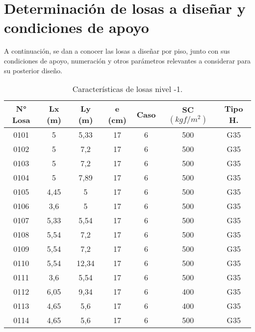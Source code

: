 \newpage
\section{Determinación de losas a diseñar y condiciones de apoyo} 
A continuación, se dan a conocer las losas a diseñar por piso, junto con sus condiciones de apoyo, numeración y otros parámetros relevantes a considerar para su posterior diseño.

\begin{table}[H]
  \centering
  \caption{Características de losas nivel -1.}
  \begin{tabular}{ccccccc}
    \hline
    \textbf{N° Losa} &      \textbf{Lx (m)} &      \textbf{Ly (m)} &      \textbf{e (cm)} &      \textbf{Caso} &      \textbf{SC $(kgf/m^2)$} &      \textbf{Tipo H.}      \bigstrut\\
        \hline
        0101 &      5 &      5,33 &      17 &      6 &      500 &      G35      \bigstrut[t]\\
        0102 &      5 &      7,2 &      17 &      6 &      500 &      G35      \\
        0103 &      5 &      7,2 &      17 &      6 &      500 &      G35      \\
        0104 &      5 &      7,89 &      17 &      6 &      500 &      G35      \\
        0105 &      4,45 &      5 &      17 &      6 &      500 &      G35      \\
        0106 &      3,6 &      5 &      17 &      6 &      500 &      G35      \\
        0107 &      5,33 &      5,54 &      17 &      6 &      500 &      G35      \\
        0108 &      5,54 &      7,2 &      17 &      6 &      500 &      G35      \\
        0109 &      5,54 &      7,2 &      17 &      6 &      500 &      G35      \\
        0110 &      5,54 &      12,34 &      17 &      6 &      500 &      G35      \\
        0111 &      3,6 &      5,54 &      17 &      6 &      500 &      G35      \\
        0112 &      6,05 &      9,34 &      17 &      6 &      400 &      G35      \\
        0113 &      4,65 &      5,6 &      17 &      6 &      400 &      G35      \\
        0114 &      4,65 &      5,6 &      17 &      6 &      500 &      G35      \\

\end{tabular}
\end{table}
